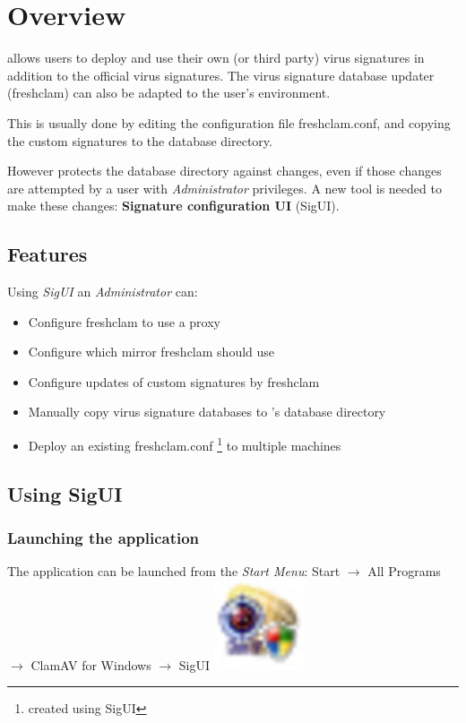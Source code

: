 \chapter{Overview}

\ClamAV allows users to deploy and use their own (or third party) virus signatures in
addition to the official virus signatures.
The virus signature database updater (\gls{freshclam}) can also be adapted to the
user's environment.

This is usually done by editing the configuration file \gls{freshclam.conf}, and copying the custom signatures to the database
directory.

However \CW protects the database directory against changes, even if those changes are attempted by a user with \emph{Administrator} privileges. 
A new tool is needed to make these changes: \textbf{Signature configuration UI} (SigUI).

\section{Features}
Using \emph{SigUI} an \emph{Administrator} can:
\begin{itemize}
\item Configure \gls{freshclam} to use a proxy
\item Configure which mirror \gls{freshclam} should use
\item Configure updates of custom signatures by \gls{freshclam}
\item Manually copy virus signature databases to \ClamAV's database directory
\item Deploy an existing \gls{freshclam.conf} \footnote{created using SigUI} to multiple machines
\end{itemize}

\section{Using SigUI}
\subsection{Launching the application}

The application can be launched from the \emph{Start Menu}:
Start $\to$ All Programs $\to$ ClamAV for Windows $\to$ SigUI \includegraphics{sigui_menu.jpg}

